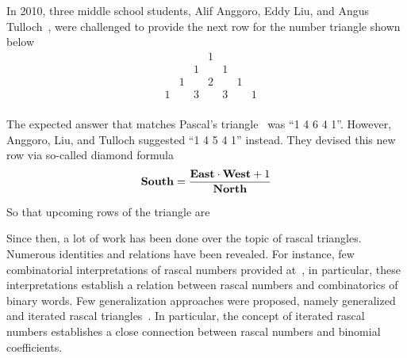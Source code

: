 In 2010, three middle school students, Alif Anggoro, Eddy Liu, and Angus Tulloch~\cite{anggoro2010rascal},
were challenged to provide the next row for the number triangle shown below
\[
    \begin{array}{cccccccc}
        &   &   &   & 1 &   &   &   \\
        &   &   & 1 &   & 1 &   &   \\
        &   & 1 &   & 2 &   & 1 &   \\
        & 1 &   & 3 &   & 3 &   & 1 \\
    \end{array}
\]

The expected answer that matches Pascal's triangle~\cite{sloane1994pascal} was ``1 4 6 4 1''.
However, Anggoro, Liu, and Tulloch suggested ``1 4 5 4 1'' instead.
They devised this new row via so-called diamond formula
\begin{align*}
    \mathbf{South}  = \frac{\mathbf{East} \cdot \mathbf{West} + 1}{\mathbf{North}}
\end{align*}

So that upcoming rows of the triangle are


Since then, a lot of work has been done over the topic of rascal triangles.
Numerous identities and relations have been revealed.
For instance, few combinatorial interpretations of rascal numbers provided at~\cite{gibbs2024two}, in particular,
these interpretations establish a relation between rascal numbers and combinatorics of binary words.
Few generalization approaches were proposed, namely generalized
and iterated rascal triangles~\cite{hotchkiss2019generalized,gregory2023iterated}.
In particular, the concept of iterated rascal numbers establishes a close connection between rascal numbers and binomial
coefficients.
